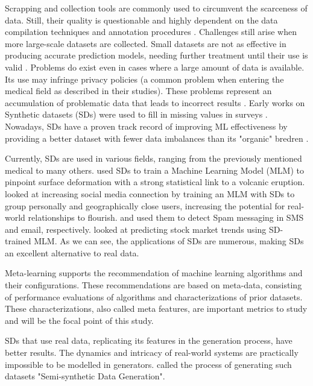 Scrapping and collection tools are commonly used to circumvent the scarceness of data. Still, their quality is questionable and highly dependent on the data compilation techniques and annotation procedures \citep{9074205}. 
Challenges still arise when more large-scale datasets are collected. Small datasets are not as effective in producing accurate prediction models, needing further treatment until their use is valid \citep{lateh2017handling}. Problems do exist even in cases where a large amount of data is available. Its use may infringe privacy policies (a common problem when entering the medical field as \cite{s19051181} described in their studies).
These problems represent an accumulation of problematic data that leads to incorrect results \citep{10.1145/3158346}. 
Early works on Synthetic datasets (SDs) were used to fill in missing values in surveys \citep{rubin1986basic}. Nowadays, SDs have a proven track record of improving ML effectiveness by providing a better dataset with fewer data imbalances than its "organic" bredren \citep{anantrasirichai2019deep, Arvanitis2021.02.11.21250741}.

Currently, SDs are used in various fields, ranging from the previously mentioned medical to many others. \cite{anantrasirichai2019deep} used SDs to train a Machine Learning Model (MLM) to pinpoint surface deformation with a strong statistical link to a volcanic eruption. \cite{yu2011geo} looked at increasing social media connection by training an MLM with SDs to group personally and geographically close users, increasing the potential for real-world relationships to flourish. \cite{sethi2017sms} and \cite{hamsapriya2011spam} used them to detect Spam messaging in SMS and email, respectively. \cite{kumar2018comparative} looked at predicting stock market trends using SD-trained MLM. As we can see, the applications of SDs are numerous, making SDs an excellent alternative to real data. 

Meta-learning supports the recommendation of machine learning algorithms and their configurations. These recommendations are based on meta-data, consisting of performance evaluations of algorithms and characterizations of prior datasets. These characterizations, also called meta features, are important metrics to study and will be the focal point of this study.

SDs that use real data, replicating its features in the generation process, have better results. The dynamics and intricacy of real-world systems are practically impossible to be modelled in generators. \cite{6890935} called the process of generating such datasets "Semi-synthetic Data Generation".

